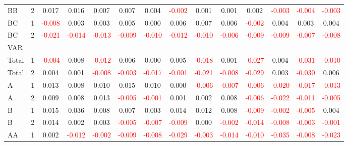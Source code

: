 \begin{table}[H]
{\begin{tabular}{llcccccccccccc}
BB & 2 & 0.017 & 0.016 & 0.007 & 0.007 & 0.004 & \textcolor{red}{-0.002} & 0.001 & 0.001 & 0.002 & \textcolor{red}{-0.003} & \textcolor{red}{-0.004} & \textcolor{red}{-0.003}\\
BC & 1 & \textcolor{red}{-0.008} & 0.003 & 0.003 & 0.005 & 0.000 & 0.006 & 0.007 & 0.006 & \textcolor{red}{-0.002} & 0.004 & 0.003 & 0.004\\
BC & 2 & \textcolor{red}{-0.021} & \textcolor{red}{-0.014} & \textcolor{red}{-0.013} & \textcolor{red}{-0.009} & \textcolor{red}{-0.010} & \textcolor{red}{-0.012} & \textcolor{red}{-0.010} & \textcolor{red}{-0.006} & \textcolor{red}{-0.009} & \textcolor{red}{-0.009} & \textcolor{red}{-0.007} & \textcolor{red}{-0.008}\\
\hline
VAR &  &  &  &  &  &  &  &  &  &  &  &  & \\
\hline
Total & 1 & \textcolor{red}{-0.004} & 0.008 & \textcolor{red}{-0.012} & 0.006 & 0.000 & 0.005 & \textcolor{red}{-0.018} & 0.001 & \textcolor{red}{-0.027} & 0.004 & \textcolor{red}{-0.031} & \textcolor{red}{-0.010}\\
Total & 2 & 0.004 & 0.001 & \textcolor{red}{-0.008} & \textcolor{red}{-0.003} & \textcolor{red}{-0.017} & \textcolor{red}{-0.001} & \textcolor{red}{-0.021} & \textcolor{red}{-0.008} & \textcolor{red}{-0.029} & 0.003 & \textcolor{red}{-0.030} & 0.006\\
A & 1 & 0.013 & 0.008 & 0.010 & 0.015 & 0.010 & 0.000 & \textcolor{red}{-0.006} & \textcolor{red}{-0.007} & \textcolor{red}{-0.006} & \textcolor{red}{-0.020} & \textcolor{red}{-0.017} & \textcolor{red}{-0.013}\\
A & 2 & 0.009 & 0.008 & 0.013 & \textcolor{red}{-0.005} & \textcolor{red}{-0.001} & 0.001 & 0.002 & 0.008 & \textcolor{red}{-0.006} & \textcolor{red}{-0.022} & \textcolor{red}{-0.011} & \textcolor{red}{-0.005}\\
B & 1 & 0.015 & 0.036 & 0.008 & 0.007 & 0.003 & 0.014 & 0.012 & 0.008 & \textcolor{red}{-0.009} & \textcolor{red}{-0.002} & \textcolor{red}{-0.005} & 0.004\\
B & 2 & 0.014 & 0.002 & 0.003 & \textcolor{red}{-0.005} & \textcolor{red}{-0.007} & \textcolor{red}{-0.009} & 0.000 & \textcolor{red}{-0.002} & \textcolor{red}{-0.014} & \textcolor{red}{-0.008} & \textcolor{red}{-0.003} & \textcolor{red}{-0.001}\\
AA & 1 & 0.002 & \textcolor{red}{-0.012} & \textcolor{red}{-0.002} & \textcolor{red}{-0.009} & \textcolor{red}{-0.008} & \textcolor{red}{-0.029} & \textcolor{red}{-0.003} & \textcolor{red}{-0.014} & \textcolor{red}{-0.010} & \textcolor{red}{-0.035} & \textcolor{red}{-0.008} & \textcolor{red}{-0.023}\\

\end{tabular}}
\end{table}
